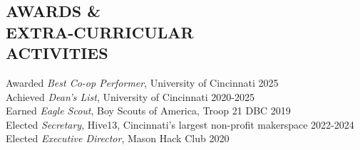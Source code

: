 \documentclass[margin]{res} %
\begin{document}
\begin{resume}
\section{AWARDS \& \\EXTRA-CURRICULAR \\ ACTIVITIES} 

Awarded {\it Best Co-op Performer}, University of Cincinnati \hfill 2025 \\
Achieved {\it Dean's List}, University of Cincinnati \hfill 2020-2025 \\
Earned {\it Eagle Scout}, Boy Scouts of America, Troop 21 DBC \hfill 2019 \\
Elected {\it Secretary}, Hive13, Cincinnati's largest non-profit makerspace \hfill 2022-2024\\
Elected {\it Executive Director}, Mason Hack Club \hfill 2020\\


\end{resume}
\end{document}
